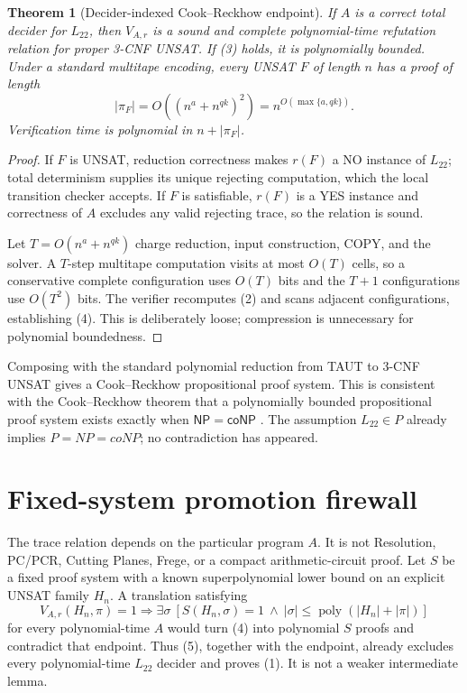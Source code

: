 \documentclass[11pt]{article}
\newtheorem{theorem}{Theorem}
\newcommand{\poly}{\operatorname{poly}}
\newcommand{\Ltwo}{L_{22}}
\begin{document}
\begin{theorem}[Decider-indexed Cook--Reckhow endpoint]
If $A$ is a correct total decider for $\Ltwo$, then $V_{A,r}$ is a sound and
complete polynomial-time refutation relation for proper 3-CNF UNSAT.  If
(3) holds, it is polynomially bounded.  Under a standard multitape encoding,
every UNSAT $F$ of length $n$ has a proof of length
\[
 |\pi_F|=O\!\left((n^a+n^{qk})^2\right)
           =n^{O(\max\{a,qk\})}.                          \tag{4}
\]
Verification time is polynomial in $n+|\pi_F|$.
\end{theorem}
\begin{proof}
If $F$ is UNSAT, reduction correctness makes $r(F)$ a NO instance of
$\Ltwo$; total determinism supplies its unique rejecting computation, which
the local transition checker accepts.  If $F$ is satisfiable, $r(F)$ is a
YES instance and correctness of $A$ excludes any valid rejecting trace, so
the relation is sound.

Let $T=O(n^a+n^{qk})$ charge reduction, input construction, COPY, and the
solver.  A $T$-step multitape computation visits at most $O(T)$ cells, so a
conservative complete configuration uses $O(T)$ bits and the $T+1$
configurations use $O(T^2)$ bits.  The verifier recomputes (2) and scans
adjacent configurations, establishing (4).  This is deliberately loose;
compression is unnecessary for polynomial boundedness.
\end{proof}

Composing with the standard polynomial reduction from TAUT to 3-CNF UNSAT
gives a Cook--Reckhow propositional proof system.  This is consistent with
the Cook--Reckhow theorem that a polynomially bounded propositional proof
system exists exactly when $\mathsf{NP}=\mathsf{coNP}$ \cite{cr,razborov}.
The assumption $\Ltwo\in P$ already implies $P=NP=coNP$; no contradiction
has appeared.

\section{Fixed-system promotion firewall}
The trace relation depends on the particular program $A$.  It is not
Resolution, PC/PCR, Cutting Planes, Frege, or a compact arithmetic-circuit
proof.  Let $S$ be a fixed proof system with a known superpolynomial lower
bound on an explicit UNSAT family $H_n$.  A translation satisfying
\[
 V_{A,r}(H_n,\pi)=1\Longrightarrow
 \exists\sigma\ [S(H_n,\sigma)=1\ \land\
 |\sigma|\le\poly(|H_n|+|\pi|)]                           \tag{5}
\]
for every polynomial-time $A$ would turn (4) into polynomial $S$ proofs and
contradict that endpoint.  Thus (5), together with the endpoint, already
excludes every polynomial-time $\Ltwo$ decider and proves (1).  It is not a
weaker intermediate lemma.
\end{document}
